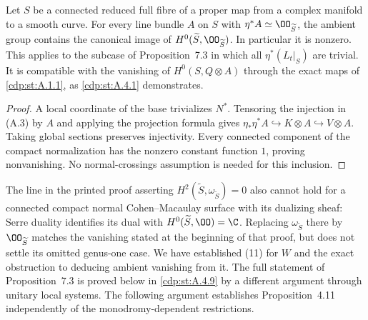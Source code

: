 
\begin{proposition}\label{cdp:st:A.5.1}
Let $S$ be a connected reduced full fibre of a proper map from a complex manifold to a smooth curve. For every line bundle $A$ on $S$ with $\eta^*A\simeq\OO_{\widetilde S}$, the ambient group contains the canonical image of $H^0(\widetilde S,\OO_{\widetilde S})$. In particular it is nonzero. This applies to the subcase of Proposition~7.3 in which all $\eta^*(L_t|_S)$ are trivial. It is compatible with the vanishing of $H^0(S,Q\otimes A)$ through the exact maps of \ref{cdp:st:A.1.1}, as \ref{cdp:st:A.4.1} demonstrates.
\end{proposition}
\begin{proof}
A local coordinate of the base trivializes $N^*$. Tensoring the injection in (A.3) by $A$ and applying the projection formula gives
$\eta_*\eta^*A\hookrightarrow K\otimes A\hookrightarrow V\otimes A$.
Taking global sections preserves injectivity. Every connected component of the compact normalization has the nonzero constant function $1$, proving nonvanishing. No normal-crossings assumption is needed for this inclusion.
\end{proof}

The line in the printed proof asserting $H^2(\widetilde S,\omega_{\widetilde S})=0$ also cannot hold for a connected compact normal Cohen--Macaulay surface with its dualizing sheaf: Serre duality identifies its dual with $H^0(\widetilde S,\OO)=\C$. Replacing $\omega_{\widetilde S}$ there by $\OO_{\widetilde S}$ matches the vanishing stated at the beginning of that proof, but does not settle its omitted genus-one case. We have established (11) for $W$ and the exact obstruction to deducing ambient vanishing from it. The full statement of Proposition~7.3 is proved below in \ref{cdp:st:A.4.9} by a different argument through unitary local systems. The following argument establishes Proposition~4.11 independently of the monodromy-dependent restrictions.


